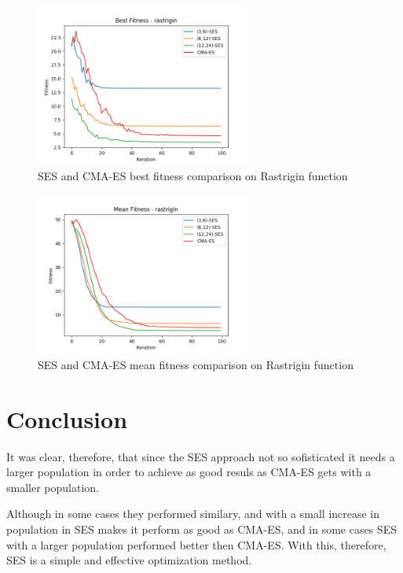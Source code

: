 \begin{figure}
  \begin{center}
  \includegraphics[width=2.8in]{./../code/benchmark_results/best_fitness-rastrigin.png}
  \caption{SES and CMA-ES best fitness comparison on Rastrigin function}
  \label{img:best_fitness-rastrigin}
  \end{center}
\end{figure}

\begin{figure}
  \begin{center}
  \includegraphics[width=2.8in]{./../code/benchmark_results/mean_fitness-rastrigin.png}
  \caption{SES and CMA-ES mean fitness comparison on Rastrigin function}
  \label{img:mean_fitness-rastrigin}
  \end{center}
\end{figure}

\section {Conclusion}

It was clear, therefore, that since the SES approach not so sofisticated it needs a larger population in order to achieve as good resuls as CMA-ES gets with a smaller population.

Although in some cases they performed similary, and with a small increase in population in SES makes it perform as good as CMA-ES, and in some cases SES with a larger population performed better then CMA-ES. With this, therefore, SES is a simple and effective optimization method.

\vfill

